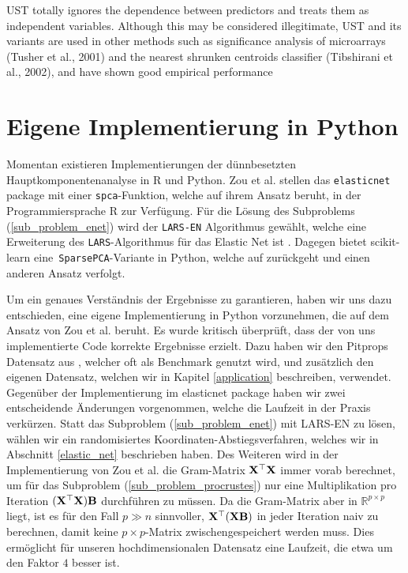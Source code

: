 UST totally ignores the dependence between predictors and treats them as independent variables. Although this may be considered illegitimate, UST and its variants are used in other methods such as significance analysis of microarrays (Tusher et al., 2001) and the nearest shrunken
centroids classifier (Tibshirani et al., 2002), and have shown good empirical performance




\section{Eigene Implementierung in Python}

Momentan existieren Implementierungen der dünnbesetzten Hauptkomponentenanalyse in R und Python. Zou et al. stellen das \texttt{elasticnet} package mit einer \texttt{spca}-Funktion, welche auf ihrem Ansatz beruht, in der Programmiersprache R zur Verfügung. Für die Lösung des Subproblems (\ref{sub_problem_enet}) wird der \texttt{LARS-EN} Algorithmus gewählt, welche eine Erweiterung des \texttt{LARS}-Algorithmus für das Elastic Net ist \cite{zou_elasticnet}. Dagegen bietet scikit-learn eine\texttt{ SparsePCA}-Variante in Python, welche auf \cite{jenatton} zurückgeht und einen anderen Ansatz verfolgt.

Um ein genaues Verständnis der Ergebnisse zu garantieren, haben wir uns dazu entschieden, eine eigene Implementierung in Python vorzunehmen, die auf dem Ansatz von Zou et al. beruht. Es wurde kritisch überprüft, dass der von uns implementierte Code korrekte Ergebnisse erzielt. Dazu haben  wir den Pitprops Datensatz aus \cite{zou_sparsepca}, welcher oft als Benchmark genutzt wird, und zusätzlich den eigenen Datensatz, welchen wir in Kapitel \ref{application} beschreiben, verwendet. Gegenüber der Implementierung im elasticnet package haben wir zwei entscheidende Änderungen vorgenommen, welche die Laufzeit in der Praxis verkürzen. Statt das Subproblem (\ref{sub_problem_enet}) mit LARS-EN zu lösen, wählen wir ein randomisiertes Koordinaten-Abstiegsverfahren, welches wir in Abschnitt \ref{elastic_net} beschrieben haben. Des Weiteren wird in der Implementierung von Zou et al. die Gram-Matrix $\mathbf{X}^{\top} \mathbf{X}$ immer vorab berechnet, um für das Subproblem (\ref{sub_problem_procrustes}) nur eine Multiplikation pro Iteration $(\mathbf{X}^{\top} \mathbf{X}) \mathbf{B}$ durchführen zu müssen. Da die Gram-Matrix aber in $\mathbb{R}^{p \times p}$ liegt, ist es für den Fall $p \gg n$ sinnvoller, $\mathbf{X}^{\top} (\mathbf{X} \mathbf{B})$ in jeder Iteration naiv zu berechnen, damit keine $p \times p$-Matrix zwischengespeichert werden muss. Dies ermöglicht für unseren hochdimensionalen Datensatz eine Laufzeit, die etwa um den Faktor $4$ besser ist.


